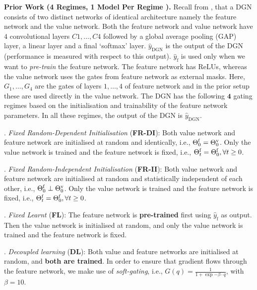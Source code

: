 \textbf{Prior Work (4 Regimes, 1 Model Per Regime ).} 
Recall from , that a DGN consists of two distinct networks of identical architecture namely the feature network and the value network. Both the feature network and value network have $4$ convolutional layers $C1,\ldots,C4$ followed by a global average pooling (GAP) layer, a linear layer and a final `softmax' layer. $\hat{y}_{\text{DGN}}$ is the output of the DGN (performance is measured with respect to this output). $\hat{y}_{\text{f}}$ is used only when we want to \emph{pre-train} the feature network. The feature network has ReLUs, whereas the value network uses the gates from feature network as external masks. Here, $G_1,\ldots,G_4$ are the gates of layers $1,\ldots,4$ of feature network and in the prior setup these are used directly in the value network. The DGN has the following $\mathbf{4}$ {gating regimes} based on the initialisation and trainability of the feature network parameters. In all these regimes, the output of the DGN is $\hat{y}_{\text{DGN}}$. 

. \emph{Fixed Random-Dependent Initialisation} (\textbf{FR-DI}): Both value network and feature network are initialised at random and identically, i.e., $\Theta^{\textrm{f}}_0={\Theta}^{\text{v}}_0$. Only the value network is trained and the feature network is fixed, i.e., $\Theta^{\textrm{f}}_t=\Theta^{\textrm{f}}_0,\forall t\geq 0$.

. \emph{Fixed Random-Independent Initialisation} (\textbf{FR-II}): Both value network and feature network are initialised at random and statistically independent of each other, i.e., $\Theta^{\textrm{f}}_0\perp {\Theta}^{\text{v}}_0$. Only the value network is trained and the feature network is fixed, i.e., $\Theta^{\textrm{f}}_t=\Theta^{\textrm{f}}_0,\forall t\geq 0$.

. \emph{Fixed Learnt} (\textbf{FL}): The feature network is \textbf{pre-trained} first using $\hat{y}_{\text{f}}$ as output. Then the value network is initialised at random, and only the value network is trained and the feature network is fixed.

. \emph{Decoupled learning} (\textbf{DL}): Both value and feature networks are initialised at random, and \textbf{both are trained}. In order to ensure that gradient flows through the feature network, we make use of \emph{soft-gating}, i.e., $G(q)=\frac{1}{1+\exp{-\beta\cdot q}}$, with $\beta=10$. 

